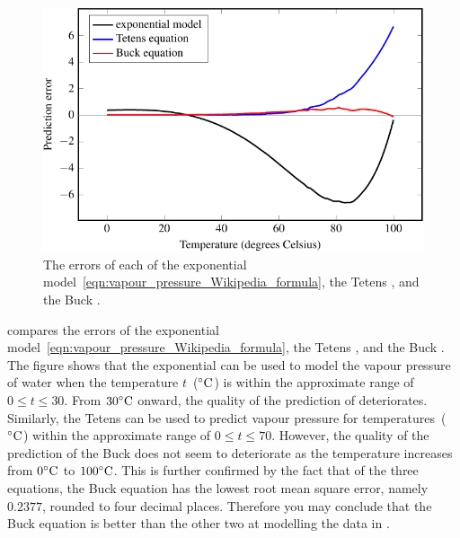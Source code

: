 \documentclass[a4paper,oneside,12pt]{article}
\begin{document}
\begin{problem}
{\begin{solution}
\begin{figure}[!htbp]
\centering
\includegraphics[scale=1.1]{image/11/vapour-pressure-errors.pdf}
\caption{%
  The errors of each of the exponential
  model~\eqref{eqn:vapour_pressure_Wikipedia_formula}, the Tetens
  , and the Buck
  .
}
\label{fig:vapour_pressure_errors}
\end{figure}

 compares the errors of the
exponential model~\eqref{eqn:vapour_pressure_Wikipedia_formula}, the
Tetens , and the Buck
.  The figure shows that the
exponential  can be
used to model the vapour pressure of water when the
temperature $t$~(${}^{\circ}\textrm{C}$) is within the approximate range of
$0 \leq t \leq 30$.  From ${30}^{\circ}\textrm{C}$ onward, the quality of the
prediction of 
deteriorates.  Similarly, the Tetens
 can be used to predict vapour
pressure for temperatures~(${}^{\circ}\textrm{C}$) within the approximate range
of $0 \leq t \leq 70$.  However, the quality of the prediction of the
Buck  does not seem to deteriorate
as the temperature increases from ${0}^{\circ}\textrm{C}$ to ${100}^{\circ}\textrm{C}$.
This is further confirmed by the fact that of the three equations, the
Buck equation has the lowest root mean square error, namely~$0.2377$,
rounded to four decimal places.  Therefore you may conclude that the
Buck equation is better than the other two at modelling the data in
.
\end{solution}
}{}


\end{problem}
\end{document}
